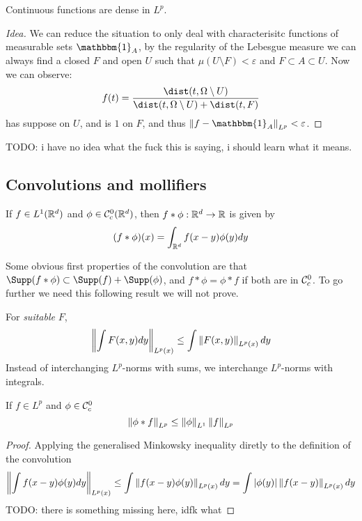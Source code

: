 \documentclass{article}
\begin{document}
\begin{proposition}
    Continuous functions are dense in $L^p$.
    \begin{proof}[Idea]
        We can reduce the situation to only deal with characterisitc functions of measurable sets $\mathbbm{1}_A$, by the regularity of the Lebesgue measure we can always find a closed $F$ and open $U$ such that $\mu(U\setminus F) < \varepsilon$ and $F\subset A \subset U$. Now we can observe: \[
        f(t) = \frac{\dist(t,\Omega\setminus U)}{\dist(t,\Omega\setminus U) + \dist(t,F)}
        \] has suppose on $U$, and is $1$ on $F$, and thus $\norm{f-\mathbbm{1}_A}_{L^p}<\varepsilon$.
    \end{proof}
    TODO: i have no idea what the fuck this is saying, i should learn what it means.
\end{proposition}

\subsection{Convolutions and mollifiers}

\begin{definition}
    If $f\in L^1(\mathbb{R}^d)$ and $\phi\in\mathcal{C}^0_c(\mathbb{R}^d)$, then $f*\phi:\mathbb{R}^d\rightarrow \mathbb{R}$ is given by \[
    (f*\phi)(x) = \int_{\mathbb{R}^d}f(x-y)\phi(y)dy
    \]
\end{definition}

Some obvious first properties of the convolution are that $\Supp(f*\phi)\subset \Supp(f) + \Supp(\phi)$, and $f*\phi = \phi*f$ if both are in $\mathcal{C}^0_c$. To go further we need this following result we will not prove.

\begin{proposition}
    For \textit{suitable} $F$, \[
    \left\lVert \int F(x,y)dy \right\rVert_{L^p(x)} \leq \int{\left\lVert F(x,y) \right\rVert_{L^p(x)}dy}
    \] Instead of interchanging $L^p$-norms with sums, we interchange $L^p$-norms with integrals.
\end{proposition}

\begin{lemma}
    If $f\in L^p$ and $\phi\in\mathcal{C}_c^0$ \[
    \left\lVert \phi*f \right\rVert_{L^p} \leq \left\lVert \phi \right\rVert_{L^1}\left\lVert f \right\rVert_{L^p}
    \]\begin{proof}
        Applying the generalised Minkowsky inequality diretly to the definition of the convolution \[
        \left\lVert \int f(x-y)\phi(y)dy \right\rVert_{L^p(x)} \leq \int\left\lVert f(x-y)\phi(y) \right\rVert_{L^p(x)}dy = \int\left| \phi(y) \right|\left\lVert f(x-y) \right\rVert_{L^p(x)}dy
        \] TODO: there is something missing here, idfk what
    \end{proof}
\end{lemma}
\end{document}
